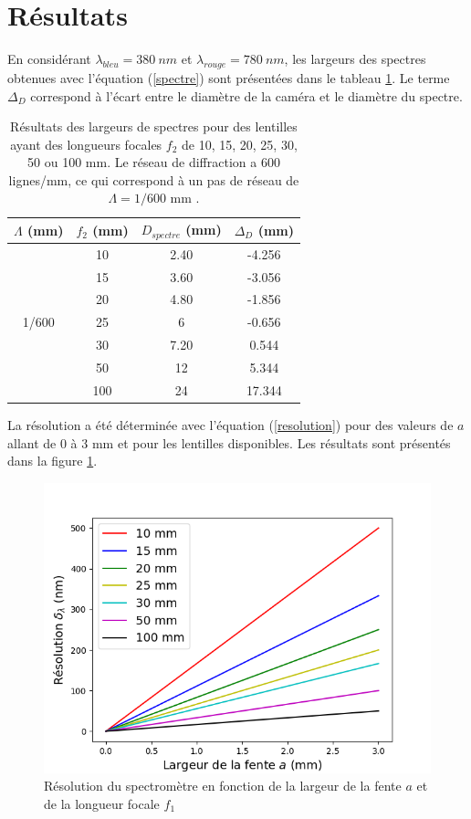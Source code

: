 \documentclass[conference]{IEEEtran}
\begin{document}
\section{Résultats \label{resultats}}
En considérant $\lambda_{bleu}=380\ nm$ et $\lambda_{rouge}=780\ nm$, les largeurs des spectres obtenues avec l'équation (\ref{spectre}) sont présentées
dans le tableau \ref{largeur_spectre}. Le terme $\Delta_D$ correspond à l'écart entre le diamètre de la caméra et le diamètre du spectre.
\begin{table}[H]
    \caption{Résultats des largeurs de spectres pour des lentilles ayant des longueurs focales
    $f_2$ de 10, 15, 20, 25, 30, 50 ou 100 mm. Le réseau de diffraction a 600 lignes/mm, ce qui correspond à un pas de réseau
    de $\Lambda=1/600$ mm \cite{grating}.}    
    \centering
    \begin{tabular}{c|c|c|c}
    $\Lambda$ (mm) & $f_2$ (mm) & $D_{spectre}$ (mm) & $\Delta_D$ (mm) \\
    \hline
    \hline
    \multirow{7}{*}{1/600} & 10 & 2.40 & -4.256 \\
    & 15 & 3.60 & -3.056 \\
    & 20 & 4.80 & -1.856 \\
    & 25 & 6 & -0.656 \\
    & 30 & 7.20 & 0.544 \\
    & 50 & 12 & 5.344 \\
    & 100 & 24 & 17.344\\
    \hline
    \end{tabular}
    \label{largeur_spectre}
\end{table}
La résolution a été déterminée avec l'équation (\ref{resolution}) pour des valeurs de $a$ allant de 0 à 3 mm et pour les lentilles
disponibles. Les résultats sont présentés dans la figure \ref{res}.
\begin{figure}[H]
    \centering
    \includegraphics[scale=0.5]{Resolution.png}
    \caption{Résolution du spectromètre en fonction de la largeur de la fente $a$ et de la longueur focale $f_1$}
    \label{res}
\end{figure}
\end{document}
